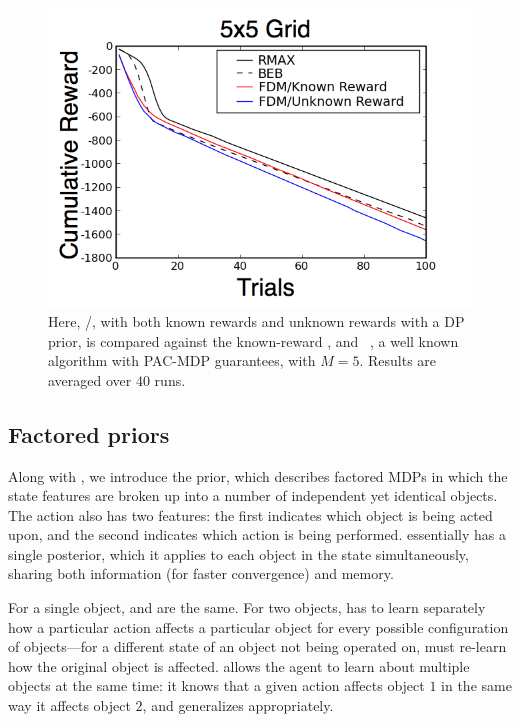 \begin{figure}
\vskip 0.2in
\begin{center}
\centerline{\includegraphics[width=0.9\linewidth]{figures/grids}}
\caption{
Here, /, with both known rewards and unknown rewards with a DP prior, is compared against the known-reward , and ~\cite{brafman02}, a well known algorithm with PAC-MDP guarantees, with $M=5$. Results are averaged over $40$ runs.
}
\label{fig:grids}
\end{center}
\vskip -0.2in
\end{figure} 

\subsection{Factored priors}

Along with , we introduce the  prior, which describes factored MDPs in which the state features are broken up into a number of independent yet identical objects. The action also has two features: the first indicates which object is being acted upon, and the second indicates which action is being performed.  essentially has a single  posterior, which it applies to each object in the state simultaneously, sharing both information (for faster convergence) and memory.


For a single object,  and  are the same. For two objects,  has to learn separately how a particular action affects a particular object for every possible configuration of objects---for a different state of an object not being operated on,  must re-learn how the original object is affected.  allows the agent to learn about multiple objects at the same time: it knows that a given action affects object $1$ in the same way it affects object $2$, and generalizes appropriately.

